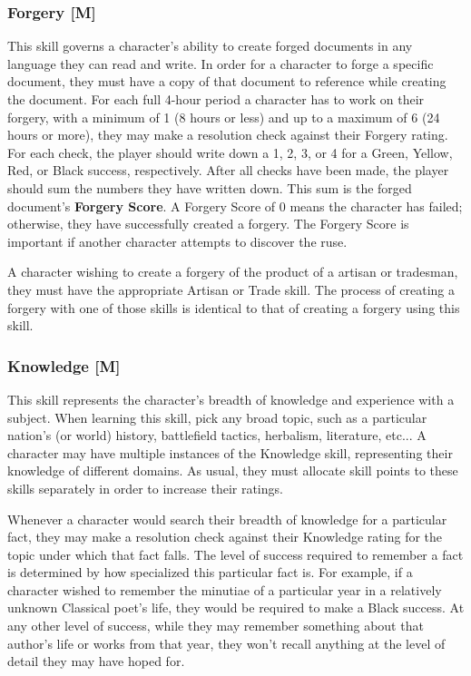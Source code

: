 \documentclass[oneside]{book}
\begin{document}
\begin{multicols}{2}
\subsubsection{Forgery [M]}
This skill governs a character's ability to create forged documents in any language they can read and write. In order for a character to forge a specific document, they must have a copy of that document to reference while creating the document. For each full 4-hour period a character has to work on their forgery, with a minimum of 1 (8 hours or less) and up to a maximum of 6 (24 hours or more), they may make a resolution check against their Forgery rating. For each check, the player should write down a 1, 2, 3, or 4 for a Green, Yellow, Red, or Black success, respectively. After all checks have been made, the player should sum the numbers they have written down. This sum is the forged document's \textbf{Forgery Score}. A Forgery Score of 0 means the character has failed; otherwise, they have successfully created a forgery. The Forgery Score is important if another character attempts to discover the ruse.

A character wishing to create a forgery of the product of a artisan or tradesman, they must have the appropriate Artisan or Trade skill. The process of creating a forgery with one of those skills is identical to that of creating a forgery using this skill.
\subsubsection{Knowledge [M]}
This skill represents the character's breadth of knowledge and experience with a subject. When learning this skill, pick any broad topic, such as a particular nation's (or world) history, battlefield tactics, herbalism, literature, etc... A character may have multiple instances of the Knowledge skill, representing their knowledge of different domains. As usual, they must allocate skill points to these skills separately in order to increase their ratings.

Whenever a character would search their breadth of knowledge for a particular fact, they may make a resolution check against their Knowledge rating for the topic under which that fact falls. The level of success required to remember a fact is determined by how specialized this particular fact is. For example, if a character wished to remember the minutiae of a particular year in a relatively unknown Classical poet's life, they would be required to make a Black success. At any other level of success, while they may remember something about that author's life or works from that year, they won't recall anything at the level of detail they may have hoped for.


\end{multicols}
\end{document}
